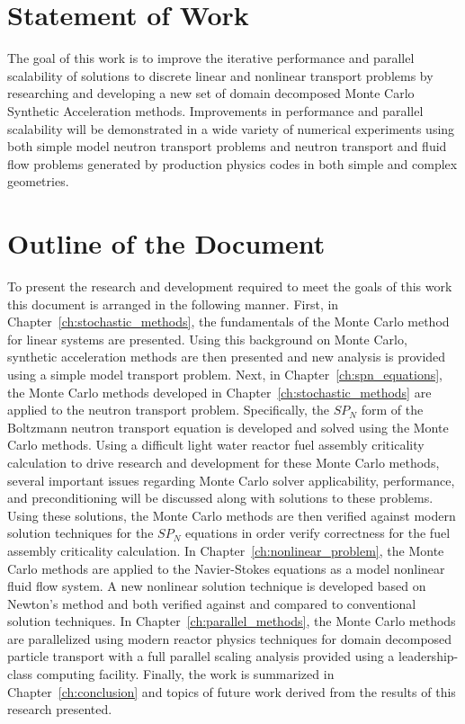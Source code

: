\section{Statement of Work}
\label{sec:statement_of_work}

The goal of this work is to improve the iterative performance and
parallel scalability of solutions to discrete linear and nonlinear
transport problems by researching and developing a new set of domain
decomposed Monte Carlo Synthetic Acceleration methods. Improvements in
performance and parallel scalability will be demonstrated in a wide
variety of numerical experiments using both simple model neutron
transport problems and neutron transport and fluid flow problems
generated by production physics codes in both simple and complex
geometries.

\section{Outline of the Document}
\label{sec:doc_outline}

To present the research and development required to meet the goals of
this work this document is arranged in the following manner. First, in
Chapter~\ref{ch:stochastic_methods}, the fundamentals of the Monte
Carlo method for linear systems are presented. Using this background
on Monte Carlo, synthetic acceleration methods are then presented and
new analysis is provided using a simple model transport problem. Next,
in Chapter~\ref{ch:spn_equations}, the Monte Carlo methods developed
in Chapter~\ref{ch:stochastic_methods} are applied to the neutron
transport problem. Specifically, the $SP_N$ form of the Boltzmann
neutron transport equation is developed and solved using the Monte
Carlo methods. Using a difficult light water reactor fuel assembly
criticality calculation to drive research and development for these
Monte Carlo methods, several important issues regarding Monte Carlo
solver applicability, performance, and preconditioning will be
discussed along with solutions to these problems. Using these
solutions, the Monte Carlo methods are then verified against modern
solution techniques for the $SP_N$ equations in order verify
correctness for the fuel assembly criticality calculation. In
Chapter~\ref{ch:nonlinear_problem}, the Monte Carlo methods are
applied to the Navier-Stokes equations as a model nonlinear fluid flow
system. A new nonlinear solution technique is developed based on
Newton's method and both verified against and compared to conventional
solution techniques. In Chapter~\ref{ch:parallel_methods}, the Monte
Carlo methods are parallelized using modern reactor physics techniques
for domain decomposed particle transport with a full parallel scaling
analysis provided using a leadership-class computing
facility. Finally, the work is summarized in
Chapter~\ref{ch:conclusion} and topics of future work derived from the
results of this research presented.

